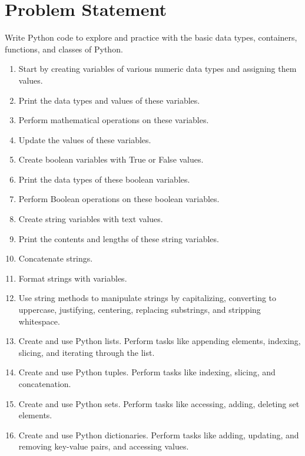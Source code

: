 
\section*{Problem Statement}
\large
Write Python code to explore and practice with the basic data types, containers, functions, and classes of Python. 

\begin{enumerate}
    \item Start by creating variables of various numeric data types and assigning them values.
    \item Print the data types and values of these variables.
    \item Perform mathematical operations on these variables.
    \item Update the values of these variables.
    \item Create boolean variables with True or False values.
    \item Print the data types of these boolean variables.
    \item Perform Boolean operations on these boolean variables.
    \item Create string variables with text values.
    \item Print the contents and lengths of these string variables.
    \item Concatenate strings.
    \item Format strings with variables.
    \item Use string methods to manipulate strings by capitalizing, converting to uppercase, justifying, centering, replacing substrings, and stripping whitespace.
    \item Create and use Python lists. Perform tasks like appending elements, indexing, slicing, and iterating through the list.
    
    \item Create and use Python tuples. Perform tasks like indexing, slicing, and concatenation.

    \item Create and use Python sets. Perform tasks like accessing, adding, deleting set elements.
    
    \item Create and use Python dictionaries. Perform tasks like adding, updating, and removing key-value pairs, and accessing values.
    

\end{enumerate}
